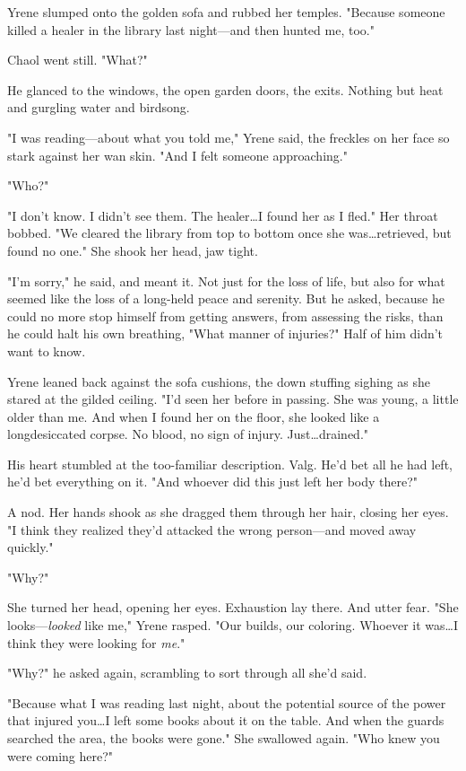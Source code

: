Yrene slumped onto the golden sofa and rubbed her temples.
"Because someone killed a healer in the library last night---and then hunted me, too."

Chaol went still.
"What?"

He glanced to the windows, the open garden doors, the exits.
Nothing but heat and gurgling water and birdsong.

"I was reading---about what you told me," Yrene said, the freckles on her face so stark against her wan skin.
"And I felt someone approaching."

"Who?"

"I don't know.
I didn't see them.
The healer\ldots I found her as I fled."
Her throat bobbed.
"We cleared the library from top to bottom once she was\ldots retrieved, but found no one."
She shook her head, jaw tight.

"I'm sorry," he said, and meant it.
Not just for the loss of life, but also for what seemed like the loss of a long-held peace and serenity.
But he asked, because he could no more stop himself from getting answers, from assessing the risks, than he could halt his own breathing, "What manner of injuries?"
Half of him didn't want to know.

Yrene leaned back against the sofa cushions, the down stuffing sighing as she stared at the gilded ceiling.
"I'd seen her before in passing.
She was young, a little older than me.
And when I found her on the floor, she looked like a longdesiccated corpse.
No blood, no sign of injury.
Just\ldots drained."

His heart stumbled at the too-familiar description.
Valg.
He'd bet all he had left, he'd bet everything on it.
"And whoever did this just left her body there?"

A nod.
Her hands shook as she dragged them through her hair, closing her eyes.
"I think they realized they'd attacked the wrong person---and moved away quickly."

"Why?"

She turned her head, opening her eyes.
Exhaustion lay there.
And utter fear.
"She looks---\emph{looked} like me," Yrene rasped.
"Our builds, our coloring.
Whoever it was\ldots I think they were looking for \emph{me}."

"Why?"
he asked again, scrambling to sort through all she'd said.

"Because what I was reading last night, about the potential source of the power that injured you\ldots I left some books about it on the table.
And when the guards searched the area, the books were gone."
She swallowed again.
"Who knew you were coming here?"

